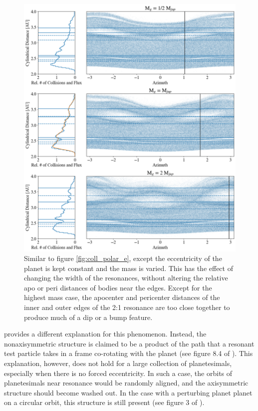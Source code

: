 \documentclass[twocolumn]{aastex63}
\begin{document}
\begin{figure}
    \includegraphics[width=\textwidth]{figures/coll_polar_m.png}
    \caption{Similar to figure \ref{fig:coll_polar_e}, except the eccentricity of the planet is kept constant and the mass is varied.
    This has the effect of changing the width of the resonances, without altering the relative apo or peri distances of
    bodies near the edges. Except for the highest mass case, the apocenter and pericenter distances of the inner and outer edges of the 2:1 
    resonance are too close together to produce much of a dip or a bump feature.\label{fig:coll_polar_m}}
\end{figure}

\citet{2016ApJ...818..159T} provides a different explanation for this phenomenon. Instead, the nonaxisymmetric structure is claimed to be a product 
of the path that a resonant test particle takes in a frame co-rotating with the planet (see figure 8.4 of \citet{2000ssd..book.....M}). This explanation, 
however, does not hold for a large collection of planetesimals, especially when there is no forced eccentricity. In such a case, the orbits of 
planetesimals near resonance would be randomly aligned, and the axisymmetric structure should become washed out. In the case with a perturbing 
planet planet on a circular orbit, this structure is still present (see figure 3 of \citet{2016ApJ...818..159T}).
\end{document}
